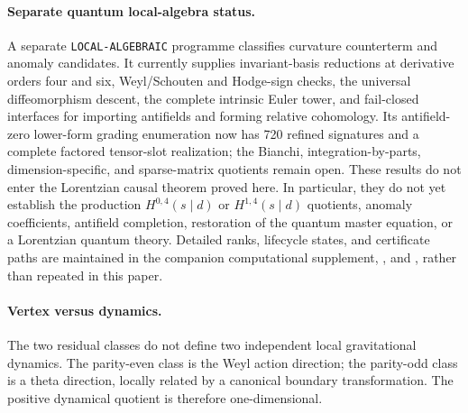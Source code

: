 \documentclass[11pt]{article}
\theoremstyle{definition}
\theoremstyle{remark}
\begin{document}
\paragraph{Separate quantum local-algebra status.}
A separate \texttt{LOCAL-ALGEBRAIC} programme classifies curvature
counterterm and anomaly candidates.  It currently supplies invariant-basis
reductions at derivative orders four and six, Weyl/Schouten and Hodge-sign
checks, the universal diffeomorphism descent, the complete intrinsic Euler
tower, and fail-closed interfaces for importing antifields and forming
relative cohomology.  Its antifield-zero lower-form grading enumeration now
has 720 refined signatures and a complete factored tensor-slot realization;
the Bianchi, integration-by-parts, dimension-specific, and sparse-matrix
quotients remain open.  These results do not enter the Lorentzian causal
theorem proved here.  In particular, they do not yet establish the production
$H^{0,4}(s\mid d)$ or $H^{1,4}(s\mid d)$ quotients, anomaly coefficients,
antifield completion, restoration of the quantum master equation, or a
Lorentzian quantum theory.  Detailed ranks, lifecycle states, and certificate
paths are maintained in the companion computational supplement,
, and , rather than
repeated in this paper.
\paragraph{Vertex versus dynamics.}
The two residual classes do not define two independent local gravitational
dynamics.  The parity-even class is the Weyl action direction; the
parity-odd class is a theta direction, locally related by a canonical
boundary transformation.  The positive dynamical quotient is therefore
one-dimensional.
\end{document}
